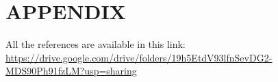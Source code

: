 \documentclass[conference]{IEEEtran}
\begin{document}






\section*{APPENDIX}

All the references are available in this link: \url{https://drive.google.com/drive/folders/19h5EtdV93lfnSevDG2-MDS90Ph91fzLM?usp=sharing} 


\printbibliography
\end{document}
